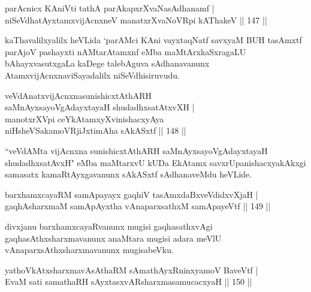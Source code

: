 \begin{shl}
parAcnicx KAniVti tathA parAkapxrXvaNasAdhanamf |\\
niSeVdhatAyxtamxvijAcnxneV manatxrXvaNoVR\s pi kAThakeV \hfill || 147 ||
\end{shl}

\begin{artha}
kaThavalilxyalilx heVLida `parAMci KAni vayxtaqNatf savxyaM BUH tasAmxtf parAjoV pashayxti nAMtarAtamxnf eMba maMtArxkaSxragaLU bAhayxvasutxgaLa kaDege talebAguva sAdhanavanunx AtamxvijAcnxnaviSayadalilx niSeVdhisiruvudu.
\end{artha}


\begin{shl}
veVdAnatxvijAcnxnasunishicxtAthARH \\
saMnAyxsayoVgAdayxtayaH shudadhxsatAtxvXH |\\
manotxrXV\s pi ceYkAtamxyXvinishacxyAya \\
niHsheVSakamoVRjiJxtimAha sAkASxtf \hfill || 148 ||
\end{shl}

\begin{artha}
``veVdAMta vijAcnxna sunishicxtAthARH saMnAyxsayoVgAdayxtayaH shudadhxsatAvxH" eMba maMtarxvU kUDa EkAtamx savxrUpanishacxyakAkxgi samasatx kamaRtAyxgavanunx sAkASxtf sAdhanaveMdu heVLide.
\end{artha}


\begin{shl}
barxhamxcayaRM samApayayx gaqhiV tasAmxdaBxveVdidxvXjaH |\\
gaqhAsharxmaM samApAyxtha vAnaparxsathxM samApayeVtf \hfill || 149 ||
\end{shl}

\begin{artha}
divxjanu barxhamxcayaRvanunx mugisi gaqhasathxvAgi gaqhasAthxsharxmavanunx anaMtara mugisi adara meVlU vAnaparxsAthxsharxmavanunx mugisabeVku.
\end{artha}


\begin{shl}
yathoVkAtxsharxmavAsAthaRM sAmathAyxRninxyamoV BaveVtf |\\
EvaM sati samathaRH sAyxtasxvARsharxmasamucacxyaH \hfill || 150 ||
\end{shl}

